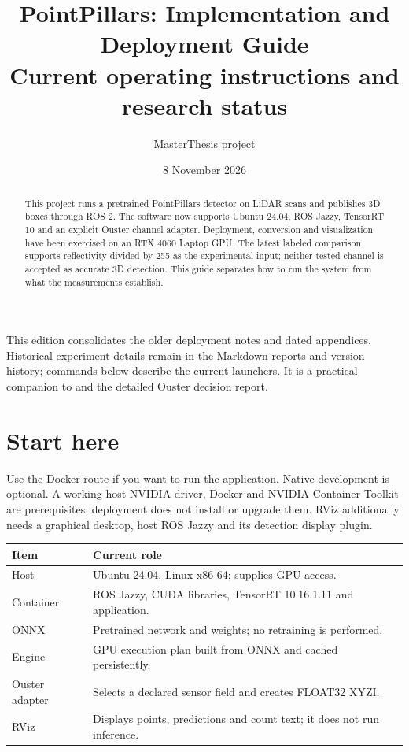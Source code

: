 \documentclass[11pt,a4paper]{article}
\title{PointPillars: Implementation and Deployment Guide\\
\large Current operating instructions and research status}
\author{MasterThesis project}
\date{8 November 2026}
\begin{document}
\maketitle
\begin{abstract}
This project runs a pretrained PointPillars detector on LiDAR scans and publishes
3D boxes through ROS 2. The software now supports Ubuntu 24.04, ROS Jazzy,
TensorRT 10 and an explicit Ouster channel adapter. Deployment, conversion and
visualization have been exercised on an RTX 4060 Laptop GPU. The latest labeled
comparison supports reflectivity divided by 255 as the experimental input;
neither tested channel is accepted as accurate 3D detection. This guide separates
how to run the system from what the measurements establish.
\end{abstract}
This edition consolidates the older deployment notes and dated appendices.
Historical experiment details remain in the Markdown reports and version history;
commands below describe the current launchers. It is a practical companion to
 and the detailed Ouster decision report.
\tableofcontents
\newpage

\section{Start here}
Use the Docker route if you want to run the application. Native development is
optional. A working host NVIDIA driver, Docker and NVIDIA Container Toolkit are
prerequisites; deployment does not install or upgrade them. RViz additionally
needs a graphical desktop, host ROS Jazzy and its detection display plugin.

\begin{tabularx}{\linewidth}{@{}lY@{}}
\toprule Item & Current role \\ \midrule
Host & Ubuntu 24.04, Linux x86-64; supplies GPU access. \\
Container & ROS Jazzy, CUDA libraries, TensorRT 10.16.1.11 and application. \\
ONNX & Pretrained network and weights; no retraining is performed. \\
Engine & GPU execution plan built from ONNX and cached persistently. \\
Ouster adapter & Selects a declared sensor field and creates FLOAT32 XYZI. \\
RViz & Displays points, predictions and count text; it does not run inference. \\
\bottomrule
\end{tabularx}
\end{document}
